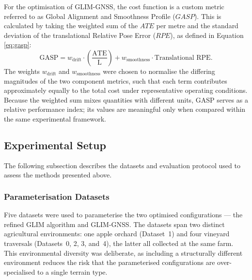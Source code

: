 For the optimisation of GLIM-GNSS, the cost function is a custom metric referred to as Global Alignment and Smoothness Profile ($GASP$). This is calculated by taking the weighted sum of the $ATE$ per metre and the standard deviation of the translational Relative Pose Error ($RPE$), as defined in Equation \eqref{eq:gasp}:
\begin{equation}
\label{eq:gasp}
\text{GASP} = w_{\text{drift}} \cdot \left( \frac{\mathrm{ATE}}{\mathrm{L}} \right) + w_{\text{smoothness}} \cdot \text{Translational RPE}.
\end{equation}
The weights $w_{\text{drift}}$ and $w_{\text{smoothness}}$ were chosen to normalise the differing magnitudes of the two component metrics, such that each term contributes approximately equally to the total cost under representative operating conditions. Because the weighted sum mixes quantities with different units, GASP serves as a relative performance index; its values are meaningful only when compared within the same experimental framework.

\subsection{Experimental Setup}
\label{subsec:slam-experimental-setup}

The following subsection describes the datasets and evaluation protocol used to assess the methods presented above.

\subsubsection{Parameterisation Datasets}

Five datasets were used to parameterise the two optimised configurations — the refined GLIM algorithm and GLIM-GNSS. The datasets span two distinct agricultural environments: one apple orchard (Dataset~1) and four vineyard traversals (Datasets~0, 2, 3, and~4), the latter all collected at the same farm. This environmental diversity was deliberate, as including a structurally different environment reduces the risk that the parameterised configurations are over-specialised to a single terrain type.

